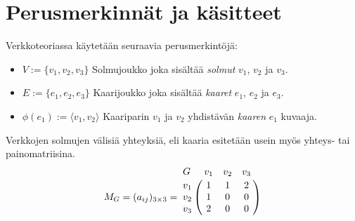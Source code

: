 \section{Perusmerkinnät ja käsitteet} \label{ch:09_perusmerkinnat_ja_kasitteet}

  Verkkoteoriassa käytetään seuraavia perusmerkintöjä:
  \begin{itemize}
    \item \(V := \{v_1, v_2, v_3\}\) Solmujoukko joka sisältää \emph{solmut} \(v_1\), \(v_2\) ja \(v_3\).
    \item \(E := \{e_1, e_2, e_3\}\) Kaarijoukko joka sisältää \emph{kaaret} \(e_1\), \(e_2\) ja \(e_3\).
    \item \(\phi(e_1) := \langle v_1, v_2 \rangle\) Kaariparin \(v_1\) ja \(v_2\) yhdistävän \emph{kaaren} \(e_1\) kuvaaja.
  \end{itemize}

  Verkkojen solmujen välisiä yhteyksiä, eli kaaria esitetään usein myös yhteys- tai painomatriisina.
  \[
    M_G = (a_{ij})_{3\times3} =
    \bordermatrix{
      G & v_1 & v_2 & v_3 \cr
      v_1 & 1 & 1 & 2 \cr
      v_2 & 1 & 0 & 0 \cr
      v_3 & 2 & 0 & 0 \cr
    }
  \]

